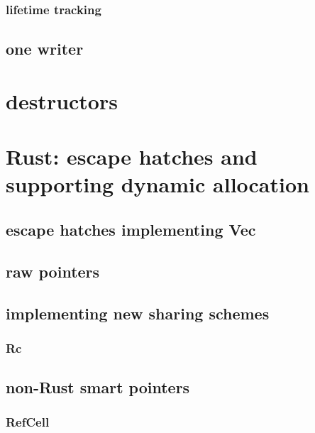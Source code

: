 \subsubsection{lifetime tracking}


\subsection{one writer}




\section{destructors}


\section{Rust: escape hatches and supporting dynamic allocation}


\subsection{escape hatches implementing Vec}


\subsection{raw pointers}



\subsection{implementing new sharing schemes}
\subsubsection{Rc}


\subsection{non-Rust smart pointers}


\subsubsection{RefCell}


